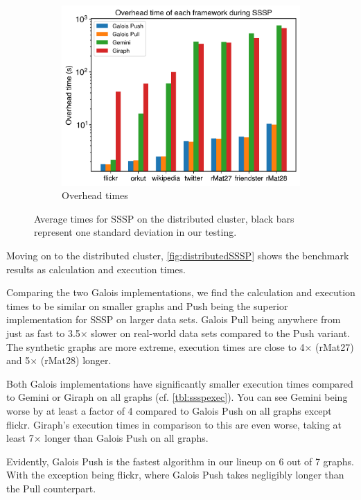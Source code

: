 \begin{figure}
\begin{subfigure}{0.32\textwidth}
		\includegraphics[width=\linewidth]{../../plots/distributedSSSP_overheadTime.png}
		\caption{Overhead times}
		\label{fig:distributedSSSP_overhead}
	\end{subfigure}
	\caption{Average times for SSSP on the distributed cluster, black bars represent one standard deviation in our testing.}
	\label{fig:distributedSSSP}
\end{figure}

Moving on to the distributed cluster, \autoref{fig:distributedSSSP} shows the benchmark results as calculation and execution times.

Comparing the two Galois implementations, we find the calculation and execution times to be similar on smaller graphs and Push being the superior implementation for SSSP on larger data sets. Galois Pull being anywhere from just as fast to 3.5$\times$ slower on real-world data sets compared to the Push variant. The synthetic graphs are more extreme, execution times are close to 4$\times$ (rMat27) and 5$\times$ (rMat28) longer.

Both Galois implementations have significantly smaller execution times compared to Gemini or Giraph on all graphs (cf. \autoref{tbl:ssspexec}).
You can see Gemini being worse by at least a factor of 4 compared to Galois Push on all graphs except flickr.
Giraph's execution times in comparison to this are even worse, taking at least 7$\times$ longer than Galois Push on all graphs.

Evidently, Galois Push is the fastest algorithm in our lineup on 6 out of 7 graphs. With the exception being flickr, where Galois Push takes negligibly longer than the Pull counterpart.


